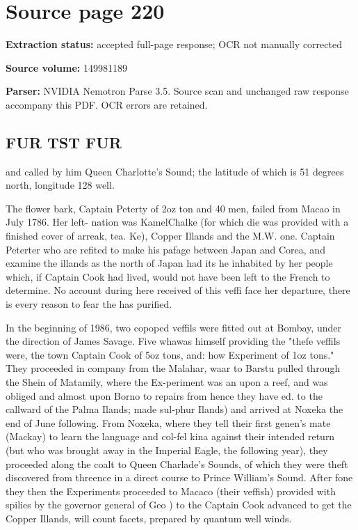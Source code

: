 \clearpage
\section{Source page 220}
\textbf{Extraction status:} accepted full-page response; OCR not manually corrected\par
\textbf{Source volume:} 149981189\par
\textbf{Parser:} NVIDIA Nemotron Parse 3.5. Source scan and unchanged raw response accompany this PDF. OCR errors are retained.\par\medskip
\subsection*{FUR TST FUR}
and called by him Queen Charlotte’s Sound; the latitude of which is 51 degrees north, longitude 128 well.\par\medskip
The flower bark, Captain Peterty of 2oz ton and 40 men, failed from Macao in July 1786. Her left- nation was KamelChalke (for which die was provided with a finished cover of arreak, tea. Ke), Copper Illands and the M.W. one. Captain Peterter who are refited to make his pafage between Japan and Corea, and examine the illands as the north of Japan had its he inhabited by her people which, if Captain Cook had lived, would not have been left to the French to determine. No account during here received of this veffi face her departure, there is every reason to fear the has purified.\par\medskip
In the beginning of 1986, two copoped veffils were fitted out at Bombay, under the direction of James Savage. Five whawas himself providing the "thefe veffils were, the town Captain Cook of 5oz tons, and: how Experiment of 1oz tons." They proceeded in company from the Malahar, waar to Barstu pulled through the Shein of Matamily, where the Ex-periment was an upon a reef, and was obliged and almost upon Borno to repairs from hence they have ed. to the callward of the Palma Ilands; made sul-phur Ilands) and arrived at Noxeka the end of June following. From Noxeka, where they tell their first genen's mate (Mackay) to learn the language and col-fel kina against their intended return (but who was brought away in the Imperial Eagle, the following year), they proceeded along the coalt to Queen Charlade's Sounds, of which they were theft discovered from threence in a direct course to Prince William's Sound. After fone they then the Experiments proceeded to Macaco (their veffish) provided with spilies by the governor general of Geo ) to the Captain Cook advanced to get the Copper Illands, will count facets, prepared by quantum well winds.\par\medskip
